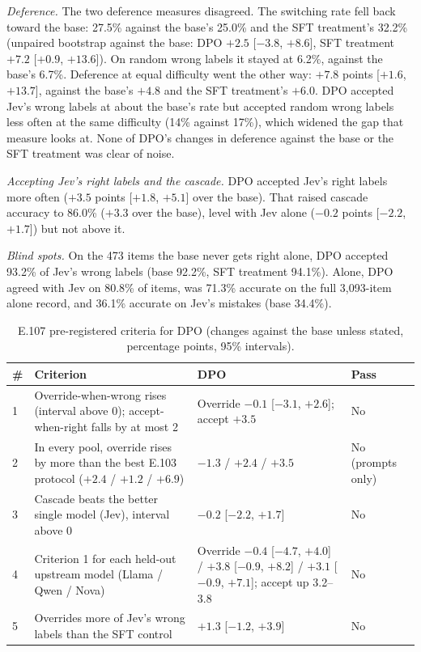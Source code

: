 \documentclass[11pt]{article}
\renewcommand{\_}{\origunderscore\allowbreak}
\begin{document}
\emph{Deference.} The two deference measures disagreed. The switching rate fell back toward the base: 27.5\% against the base's 25.0\% and the SFT treatment's 32.2\% (unpaired bootstrap against the base: DPO $+2.5$ [$-3.8$, $+8.6$], SFT treatment $+7.2$ [$+0.9$, $+13.6$]). On random wrong labels it stayed at 6.2\%, against the base's 6.7\%. Deference at equal difficulty went the other way: $+7.8$ points [$+1.6$, $+13.7$], against the base's $+4.8$ and the SFT treatment's $+6.0$. DPO accepted Jev's wrong labels at about the base's rate but accepted random wrong labels less often at the same difficulty (14\% against 17\%), which widened the gap that measure looks at. None of DPO's changes in deference against the base or the SFT treatment was clear of noise.

\emph{Accepting Jev's right labels and the cascade.} DPO accepted Jev's right labels more often ($+3.5$ points [$+1.8$, $+5.1$] over the base). That raised cascade accuracy to 86.0\% ($+3.3$ over the base), level with Jev alone ($-0.2$ points [$-2.2$, $+1.7$]) but not above it.

\emph{Blind spots.} On the 473 items the base never gets right alone, DPO accepted 93.2\% of Jev's wrong labels (base 92.2\%, SFT treatment 94.1\%). Alone, DPO agreed with Jev on 80.8\% of items, was 71.3\% accurate on the full 3{,}093-item alone record, and 36.1\% accurate on Jev's mistakes (base 34.4\%).

\begin{table}[H]
\centering
\small
\caption{E.107 pre-registered criteria for DPO (changes against the base unless stated, percentage points, 95\% intervals).}
\label{tab:e107-criteria}
\begin{tabularx}{\textwidth}{p{0.3cm}Xp{5.2cm}l}
\toprule
\# & Criterion & DPO & Pass \\
\midrule
1 & Override-when-wrong rises (interval above 0); accept-when-right falls by at most 2 & Override $-0.1$ [$-3.1$, $+2.6$]; accept $+3.5$ & No \\
2 & In every pool, override rises by more than the best E.103 protocol ($+2.4$ / $+1.2$ / $+6.9$) & $-1.3$ / $+2.4$ / $+3.5$ & No (prompts only) \\
3 & Cascade beats the better single model (Jev), interval above 0 & $-0.2$ [$-2.2$, $+1.7$] & No \\
4 & Criterion 1 for each held-out upstream model (Llama / Qwen / Nova) & Override $-0.4$ [$-4.7$, $+4.0$] / $+3.8$ [$-0.9$, $+8.2$] / $+3.1$ [$-0.9$, $+7.1$]; accept up 3.2--3.8 & No \\
5 & Overrides more of Jev's wrong labels than the SFT control & $+1.3$ [$-1.2$, $+3.9$] & No \\
\bottomrule
\end{tabularx}
\end{table}
\end{document}
